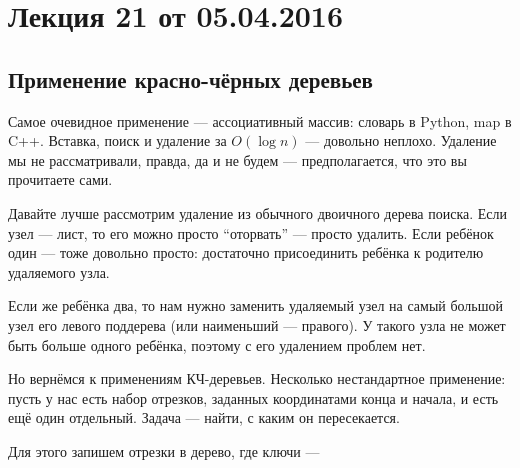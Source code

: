 



\section*{Лекция 21 от 05.04.2016}

\subsection{Применение красно-чёрных деревьев}

Самое очевидное применение --- ассоциативный массив: словарь в Python, map в C++. Вставка, поиск и удаление за $O(\log n)$ --- довольно неплохо. Удаление мы не рассматривали, правда, да и не будем --- предполагается, что это вы прочитаете сами.

Давайте лучше рассмотрим удаление из обычного двоичного дерева поиска. Если узел --- лист, то его можно просто ``оторвать'' --- просто удалить. Если ребёнок один --- тоже довольно просто: достаточно присоединить ребёнка к родителю удаляемого узла. 

Если же ребёнка два, то нам нужно заменить удаляемый узел на самый большой узел его левого поддерева (или наименьший --- правого). У такого узла не может быть больше одного ребёнка, поэтому с его удалением проблем нет.


Но вернёмся к применениям КЧ-деревьев. Несколько нестандартное применение: пусть у нас есть набор отрезков, заданных координатами конца и начала, и есть ещё один отдельный. Задача --- найти, с каким он пересекается.

Для этого запишем отрезки в дерево, где ключи --- 


